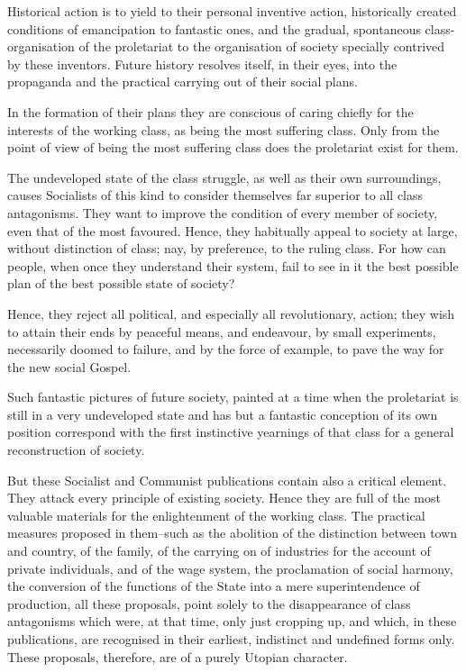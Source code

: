 \documentclass[, oneside]{article}   	%
\begin{document}
Historical action is to yield to their personal inventive action, historically created conditions of emancipation to fantastic ones, and the gradual, spontaneous class-organisation of the proletariat to the organisation of society specially contrived by these inventors. Future history resolves itself, in their eyes, into the propaganda and the practical carrying out of their social plans.

In the formation of their plans they are conscious of caring chiefly for the interests of the working class, as being the most suffering class. Only from the point of view of being the most suffering class does the proletariat exist for them.

The undeveloped state of the class struggle, as well as their own surroundings, causes Socialists of this kind to consider themselves far superior to all class antagonisms. They want to improve the condition of every member of society, even that of the most favoured. Hence, they habitually appeal to society at large, without distinction of class; nay, by preference, to the ruling class. For how can people, when once they understand their system, fail to see in it the best possible plan of the best possible state of society?

Hence, they reject all political, and especially all revolutionary, action; they wish to attain their ends by peaceful means, and endeavour, by small experiments, necessarily doomed to failure, and by the force of example, to pave the way for the new social Gospel.

Such fantastic pictures of future society, painted at a time when the proletariat is still in a very undeveloped state and has but a fantastic conception of its own position correspond with the first instinctive yearnings of that class for a general reconstruction of society.

But these Socialist and Communist publications contain also a critical element. They attack every principle of existing society. Hence they are full of the most valuable materials for the enlightenment of the working class. The practical measures proposed in them--such as the abolition of the distinction between town and country, of the family, of the carrying on of industries for the account of private individuals, and of the wage system, the proclamation of social harmony, the conversion of the functions of the State into a mere superintendence of production, all these proposals, point solely to the disappearance of class antagonisms which were, at that time, only just cropping up, and which, in these publications, are recognised in their earliest, indistinct and undefined forms only. These proposals, therefore, are of a purely Utopian character.
\end{document}
